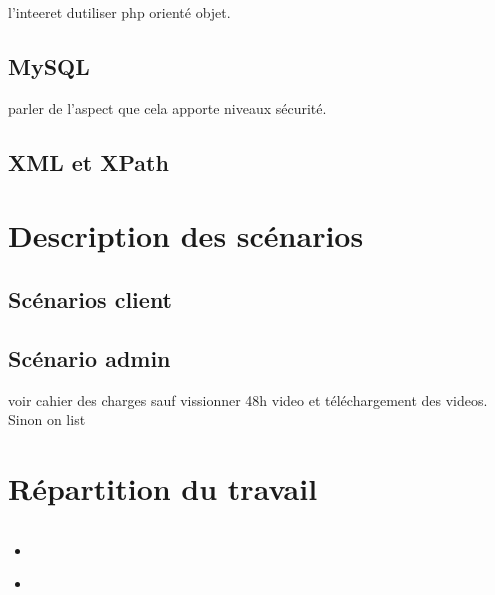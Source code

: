 \documentclass[a4paper,10pt]{report}
\begin{document}
l'inteeret dutiliser php orienté objet.

\section{MySQL }

parler de l'aspect que cela apporte niveaux sécurité.

\section{XML et XPath}

\chapter{Description des scénarios}

\section{Scénarios client}

\section{Scénario admin}

voir cahier des charges sauf vissionner 48h video et téléchargement des videos.
Sinon on list

\chapter{Répartition du travail}

\section{}

\subsection{}

\subsubsection{}

\paragraph{}

\subparagraph{}

\section{}

\begin{itemize}
\item 
\end{itemize}

\begin{itemize}
\item 
\end{itemize}

\begin{description}
\item 
\end{description}

\section{}
\end{document}

